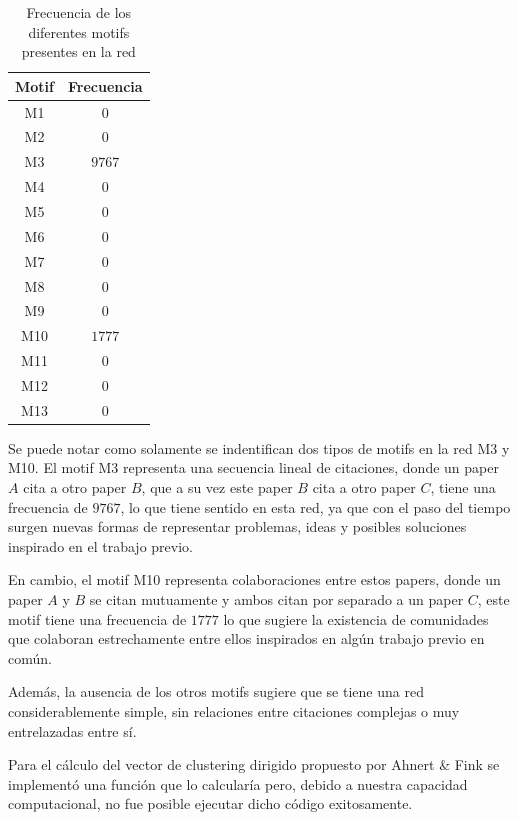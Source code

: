 \documentclass[12pt]{article}
\begin{document}
\begin{enumerate}
    \begin{table}[H]
        \centering
        \begin{tabular}{|c|c|}
            \hline
            \textbf{Motif} & \textbf{Frecuencia} \\ \hline
            M1 & $0$ \\ \hline
            M2 & $0$ \\ \hline
            M3 & $9767$ \\ \hline
            M4 & $0$ \\ \hline
            M5 & $0$ \\ \hline
            M6 & $0$ \\ \hline
            M7 & $0$ \\ \hline
            M8 & $0$ \\ \hline
            M9 & $0$ \\ \hline
            M10 & $1777$ \\ \hline
            M11 & $0$ \\ \hline
            M12 & $0$ \\ \hline
            M13 & $0$ \\ \hline
        \end{tabular}
        \caption{Frecuencia de los diferentes motifs presentes en la red}
        \label{tab:motifs}
    \end{table}

    Se puede notar como solamente se indentifican dos tipos de motifs en la red M3 y M10. El motif M3 representa una secuencia lineal de citaciones, donde un paper $A$ cita a otro paper $B$, que a su vez este paper $B$ cita a otro paper $C$, tiene una frecuencia de $9767$, lo que tiene sentido en esta red, ya que con el paso del tiempo surgen nuevas formas de representar problemas, ideas y posibles soluciones inspirado en el trabajo previo.
    
    En cambio, el motif M10 representa colaboraciones entre estos papers, donde un paper $A$ y $B$ se citan mutuamente y ambos citan por separado a un paper $C$, este motif tiene una frecuencia de $1777$ lo que sugiere la existencia de comunidades que colaboran estrechamente entre ellos inspirados en algún trabajo previo en común.

    Además, la ausencia de los otros motifs sugiere que se tiene una red considerablemente simple, sin relaciones entre citaciones complejas o muy entrelazadas entre sí.

    Para el cálculo del vector de clustering dirigido propuesto por Ahnert \& Fink se implementó una función que lo calcularía pero, debido a nuestra capacidad computacional, no fue posible ejecutar dicho código exitosamente.


\end{enumerate}
\end{document}
